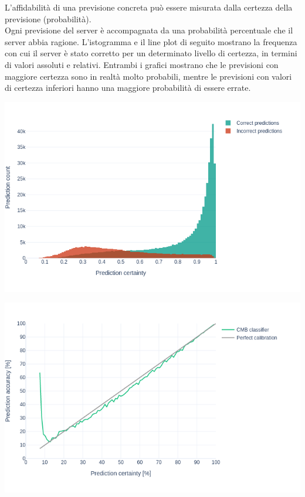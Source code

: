 \documentclass{article}
\begin{document}
L'affidabilità di una previsione concreta può essere misurata dalla certezza della previsione (probabilità).\\
Ogni previsione del server è accompagnata da una probabilità percentuale che il server abbia ragione. L'istogramma e il line plot di seguito mostrano la frequenza con cui il server è stato corretto per un determinato livello di certezza, in termini di valori assoluti e relativi. Entrambi i grafici mostrano che le previsioni con maggiore certezza sono in realtà molto probabili, mentre le previsioni con valori di certezza inferiori hanno una maggiore probabilità di essere errate.
\begin{center}
  \includegraphics[width=1\textwidth]{figures/Istogramma.png}
\end{center}

\begin{center}
  \includegraphics[width=1\textwidth]{figures/LinePlot.png}
\end{center}
\end{document}
